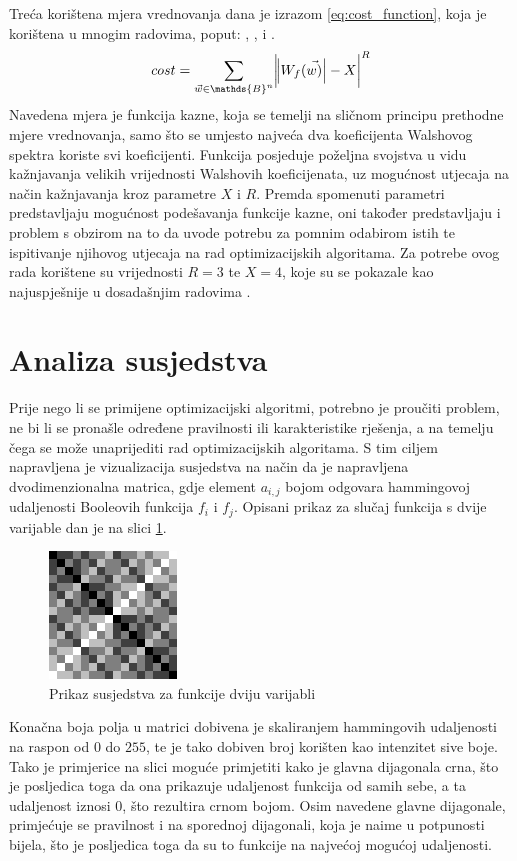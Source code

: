 Treća korištena mjera vrednovanja dana je izrazom \eqref{eq:cost_function}, koja je korištena u mnogim radovima, poput: \cite{MaximalNonlinearity}, \cite{CryptographicBoolean}, \cite{EvolvingBoolean} i \cite{picek2016new}.
\begin{equation}\label{eq:cost_function}
    cost = \sum_{\vec{w}\in \mathds{B}^n} \abs{\abs{W_f(\vec{w)}} - X}^R
\end{equation}
Navedena mjera je funkcija kazne, koja se temelji na sličnom principu prethodne mjere vrednovanja, samo što se umjesto najveća dva koeficijenta Walshovog spektra koriste svi koeficijenti.
Funkcija posjeduje poželjna svojstva u vidu kažnjavanja velikih vrijednosti Walshovih koeficijenata, uz mogućnost utjecaja na način kažnjavanja kroz parametre $X$ i $R$.
Premda spomenuti parametri predstavljaju mogućnost podešavanja funkcije kazne, oni također predstavljaju i problem s obzirom na to da uvode potrebu za pomnim odabirom istih te ispitivanje njihovog utjecaja na rad optimizacijskih algoritama.
Za potrebe ovog rada korištene su vrijednosti $R=3$ te $X=4$, koje su se pokazale kao najuspješnije u dosadašnjim radovima \cite{EvolvingBoolean}.

\section{Analiza susjedstva}
Prije nego li se primijene optimizacijski algoritmi, potrebno je proučiti problem, ne bi li se pronašle određene pravilnosti ili karakteristike rješenja, a na temelju čega se može unaprijediti rad optimizacijskih algoritama.
S tim ciljem napravljena je vizualizacija susjedstva na način da je napravljena dvodimenzionalna matrica, gdje element $a_{i, j}$ bojom odgovara hammingovoj udaljenosti Booleovih funkcija $f_i$ i $f_j$.
Opisani prikaz za slučaj funkcija s dvije varijable dan je na slici \ref{fig:function_2}. 
\begin{figure}[ht!] 
    \centering
    \includegraphics[width=.4\textwidth]{img/function_2}
    \captionsetup{justification=centering}
    \caption{Prikaz susjedstva za funkcije dviju varijabli}
    \label{fig:function_2}
\end{figure}
Konačna boja polja u matrici dobivena je skaliranjem hammingovih udaljenosti na raspon od $0$ do $255$, te je tako dobiven broj korišten kao intenzitet sive boje.
Tako je primjerice na slici moguće primjetiti kako je glavna dijagonala crna, što je posljedica toga da ona prikazuje udaljenost funkcija od samih sebe, a ta udaljenost iznosi $0$, što rezultira crnom bojom.
Osim navedene glavne dijagonale, primjećuje se pravilnost i na sporednoj dijagonali, koja je naime u potpunosti bijela, što je posljedica toga da su to funkcije na najvećoj mogućoj udaljenosti.

